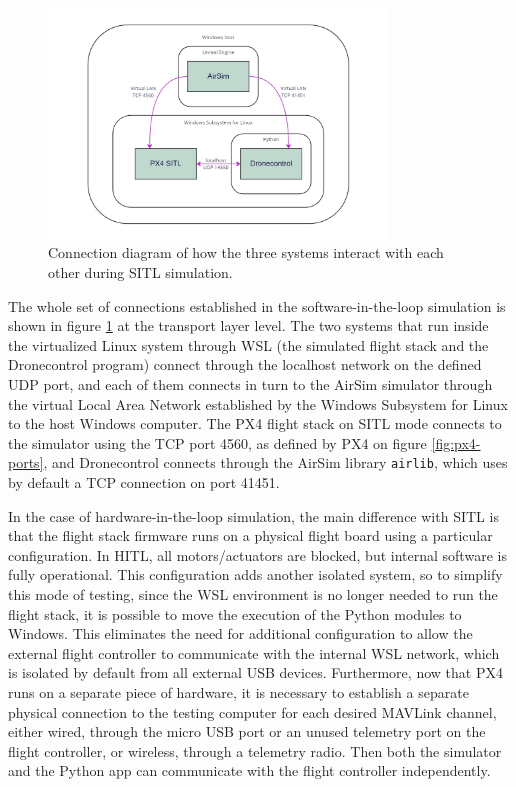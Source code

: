 \begin{figure}
  \centering
  \includegraphics[width=0.8\textwidth,keepaspectratio]{img/sitl-connections.jpg}
  \caption{Connection diagram of how the three systems interact with each other during SITL simulation.}
  \label{fig:sitl-connections}
\end{figure}

The whole set of connections established in the software-in-the-loop simulation is shown in figure \ref{fig:sitl-connections} at the transport layer level.
The two systems that run inside the virtualized Linux system through WSL (the simulated flight stack and the Dronecontrol program) connect through the localhost network on the defined UDP port, and each of them connects in turn to the AirSim simulator through the virtual Local Area Network established by the Windows Subsystem for Linux to the host Windows computer.
The PX4 flight stack on SITL mode connects to the simulator using the TCP port 4560, as defined by PX4 on figure \ref{fig:px4-ports}, and Dronecontrol connects through the AirSim library \texttt{airlib}, which uses by default a TCP connection on port 41451.

In the case of hardware-in-the-loop simulation, the main difference with SITL is that the flight stack firmware runs on a physical flight board using a particular configuration.
In HITL, all motors/actuators are blocked, but internal software is fully operational.
This configuration adds another isolated system, so to simplify this mode of testing, since the WSL environment is no longer needed to run the flight stack, it is possible to move the execution of the Python modules to Windows.
This eliminates the need for additional configuration to allow the external flight controller to communicate with the internal WSL network, which is isolated by default from all external USB devices.
Furthermore, now that PX4 runs on a separate piece of hardware, it is necessary to establish a separate physical connection to the testing computer for each desired MAVLink channel,
either wired, through the micro USB port or an unused telemetry port on the flight controller, or wireless, through a telemetry radio.
Then both the simulator and the Python app can communicate with the flight controller independently.

